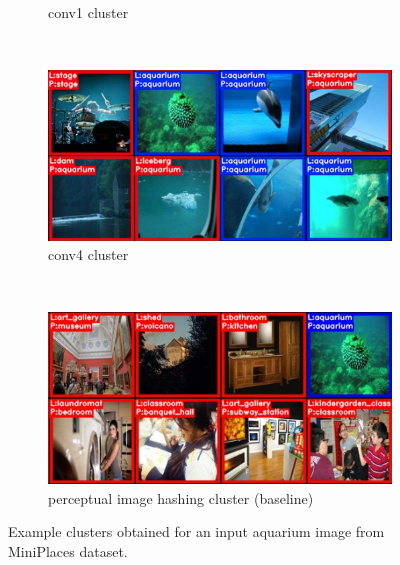 \begin{figure}[htb]
\begin{subfigure}[b]{.99\linewidth}
    \caption{conv1 cluster}\label{fig:clustering_aquarium_conv1}
  \end{subfigure}  \\%
  \begin{subfigure}[b]{.99\linewidth}
    \centering
    \includegraphics[width=.99\textwidth]{figures/clustering/aquarium_conv4_avg}
    \caption{conv4 cluster}\label{fig:clustering_aquarium_conv1}
  \end{subfigure}  \\%
  \begin{subfigure}[b]{.99\linewidth}
    \centering
    \includegraphics[width=.99\textwidth]{figures/clustering/aquarium_dhash}
    \caption{perceptual image hashing cluster (baseline)}\label{fig:clustering_baseline}
  \end{subfigure}%
  \caption{Example clusters obtained for an input aquarium image from MiniPlaces dataset.}
  \label{fig:aquarium_clusters}
\end{figure}